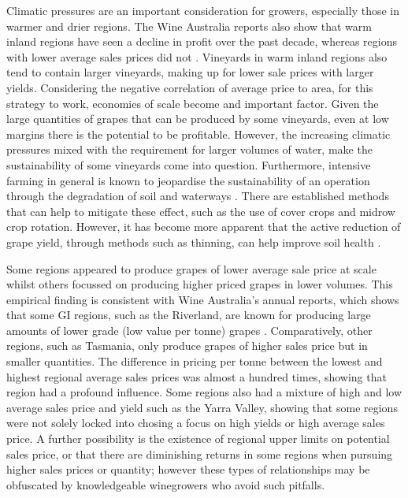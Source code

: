 \documentclass[review,12pt,authoryear]{elsarticle}
\begin{document}
\begin{linenumbers}
Climatic pressures are an important consideration for growers, especially those in warmer and drier regions. The Wine Australia reports also show that warm inland regions have seen a decline in profit over the past decade, whereas regions with lower average sales prices did not \citep{wineaustraliaNationalVintageReport2019,wineaustraliaNationalVintageReport2020,wineaustraliaNationalVintageReport2021,winemakersfederationofaustraliaNationalVintageReport2013,winemakersfederationofaustraliaNationalVintageReport2014,winemakersfederationofaustraliaNationalVintageReport2015,winemakersfederationofaustraliaNationalVintageReport2016,winemakersfederationofaustraliaNationalVintageReport2017,winemakersfederationofaustraliaNationalVintageReport2018}. Vineyards in warm inland regions also tend to contain larger vineyards, making up for lower sale prices with larger yields. Considering the negative correlation of average price to area, for this strategy to work, economies of scale become and important factor. Given the large quantities of grapes that can be produced by some vineyards, even at low margins there is the potential to be profitable. However, the increasing climatic pressures mixed with the requirement for larger volumes of water, make the sustainability of some vineyards come into question. Furthermore, intensive farming in general is known to jeopardise the sustainability of an operation through the degradation of soil and waterways \citep{capelloEffectsTractorPasses2019,linHydropedologySynergisticIntegration2012,pisciottaGroundwaterNitrateRisk2015}. There are established methods that can help to mitigate these effect, such as the use of cover crops and midrow crop rotation. However, it has become more apparent that the active reduction of grape yield, through methods such as thinning, can help improve soil health \citep{condursoEffectsClusterThinning2016,wangChangesGlobalAroma2019}.
\par
Some regions appeared to produce grapes of lower average sale price at scale whilst others focussed on producing higher priced grapes in lower volumes. This empirical finding is consistent with Wine Australia's annual reports, which shows that some GI regions, such as the Riverland, are known for producing large amounts of lower grade (low value per tonne) grapes \citep{wineaustraliaNationalVintageReport2022,winemakersfederationofaustraliaNationalVintageReport2017}. Comparatively, other regions, such as Tasmania, only produce grapes of higher sales price but in smaller quantities. The difference in pricing per tonne between the lowest and highest regional average sales prices was almost a hundred times, showing that region had a profound influence. Some regions also had a mixture of high and low average sales price and yield such as the Yarra Valley, showing that some regions were not solely locked into chosing a focus on high yields or high average sales price. A further possibility is the existence of regional upper limits on potential sales price, or that there are diminishing returns in some regions when pursuing higher sales prices or quantity; however these types of relationships may be obfuscated by knowledgeable winegrowers who avoid such pitfalls.

\end{linenumbers}
\end{document}
